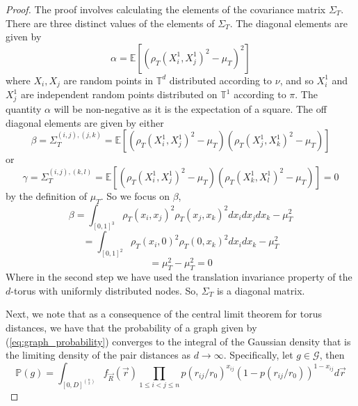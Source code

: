 \documentclass{article}
\newcommand{\tti}{\rightarrow\infty}
\newcommand{\prob}[1]{\mathbb{P}\left(#1\right)}
\begin{document}
\begin{proof}
    The proof involves calculating the elements of the covariance matrix $\Sigma_T$. There are three distinct values of the elements of $\Sigma_T$. The diagonal elements are given by
    \begin{equation}
        \alpha = \mathbb{E}[(\rho_T(X_i^1,X_j^1)^2-\mu_T)^2]
    \end{equation}
    where  $X_i, X_j$ are random points in $\mathbb{T}^d$ distributed according to $\nu$, and so $X_i^1$ and $X_j^1$ are independent random points distributed on $\mathbb{T}^1$ according to $\pi$.  The quantity $\alpha$ will be non-negative as it is the expectation of a square. The off diagonal elements are given by either
    \begin{equation}
        \beta = \Sigma_T^{(i,j),(j,k)} = \mathbb{E}[(\rho_T(X_i^1,X_j^1)^2-\mu_T)(\rho_T(X_j^1,X_k^1)^2-\mu_T)]
    \end{equation}
    or 
    \begin{equation}
        \gamma = \Sigma_T^{(i,j),(k,l)} = \mathbb{E}[(\rho_T(X_i^1,X_j^1)^2-\mu_T)(\rho_T(X_k^1, X_l^1)^2-\mu_T)] = 0
    \end{equation}
    by the definition of $\mu_T$. So we focus on $\beta$,
    \begin{equation}
        \beta = \int_{[0,1]^3} \rho_T(x_i,x_j)^2\rho_T(x_j,x_k)^2 dx_idx_jdx_k - \mu_T^2
    \end{equation}
    \begin{equation}
        = \int_{[0,1]^2} \rho_T(x_i,0)^2\rho_T(0,x_k)^2 dx_idx_k - \mu_T^2
    \end{equation}
    \begin{equation}
        =\mu_T^2-\mu_T^2 = 0
    \end{equation}
    Where in the second step we have used the translation invariance property of the $d$-torus with uniformly distributed nodes. So, $\Sigma_T$ is a diagonal matrix. \newline

    Next, we note that as a consequence of the central limit theorem for torus distances, we have that the probability of a graph given by (\ref{eq:graph_probability}) converges to the integral of the Gaussian density that is the limiting density of the pair distances as $d\tti$. Specifically, let $g \in \mathcal{G}$, then
    \begin{equation}
        \label{eq:general_torus_prob}
        \prob{g} = \int_{[0,D]^{\binom{n}{2}}} f_{\vec{R}}(\vec{r})\prod_{1\leq i < j \leq n} p(r_{ij}/r_0)^{x_{ij}}(1-p(r_{ij}/r_0))^{1-x_{ij}} d\vec{r}
    \end{equation}
    

\end{proof}
\end{document}
